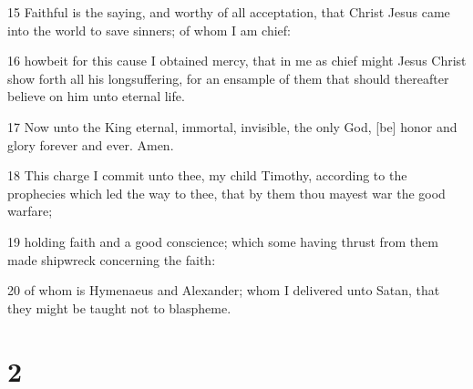 \par 15 Faithful is the saying, and worthy of all acceptation, that Christ Jesus came into the world to save sinners; of whom I am chief:
\par 16 howbeit for this cause I obtained mercy, that in me as chief might Jesus Christ show forth all his longsuffering, for an ensample of them that should thereafter believe on him unto eternal life.
\par 17 Now unto the King eternal, immortal, invisible, the only God, [be] honor and glory forever and ever. Amen.
\par 18 This charge I commit unto thee, my child Timothy, according to the prophecies which led the way to thee, that by them thou mayest war the good warfare;
\par 19 holding faith and a good conscience; which some having thrust from them made shipwreck concerning the faith:
\par 20 of whom is Hymenaeus and Alexander; whom I delivered unto Satan, that they might be taught not to blaspheme.

\chapter{2}

